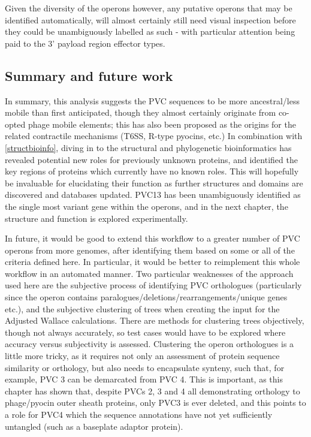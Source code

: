 Given the diversity of the operons however, any putative operons that may be identified automatically, will almost certainly still need visual inspection before they could be unambiguously labelled as such - with particular attention being paid to the 3' payload region effector types.
\newline


\subsection{Summary and future work}
In summary, this analysis suggests the PVC sequences to be more ancestral/less mobile than first anticipated, though they almost certainly originate from co-opted phage mobile elements; this has also been proposed as the origins for the related contractile mechanisms (T6SS, R-type pyocins, etc.) In combination with \vref{structbioinfo}, diving in to the structural and phylogenetic bioinformatics has revealed potential new roles for previously unknown proteins, and identified the key regions of proteins which currently have no known roles. This will hopefully be invaluable for elucidating their function as further structures and domains are discovered and databases updated. PVC13 has been unambiguously identified as the single most variant gene within the operons, and in the next chapter, the structure and function is explored experimentally.

In future, it would be good to extend this workflow to a greater number of PVC operons from more genomes, after identifying them based on some or all of the criteria defined here. In particular, it would be better to reimplement this whole workflow in an automated manner. Two particular weaknesses of the approach used here are the subjective process of identifying PVC orthologues (particularly since the operon contains paralogues/deletions/rearrangements/unique genes etc.), and the subjective clustering of trees when creating the input for the Adjusted Wallace calculations. There are methods for clustering trees objectively, though not always accurately, so test cases would have to be explored where accuracy versus subjectivity is assessed. Clustering the operon orthologues is a little more tricky, as it requires not only an assessment of protein sequence similarity or orthology, but also needs to encapsulate synteny, such that, for example, PVC 3 can be demarcated from PVC 4. This is important, as this chapter has shown that, despite PVCs 2, 3 and 4 all demonstrating orthology to phage/pyocin outer sheath proteins, only PVC3 is ever deleted, and this points to a role for PVC4 which the sequence annotations have not yet sufficiently untangled (such as a baseplate adaptor protein). 

